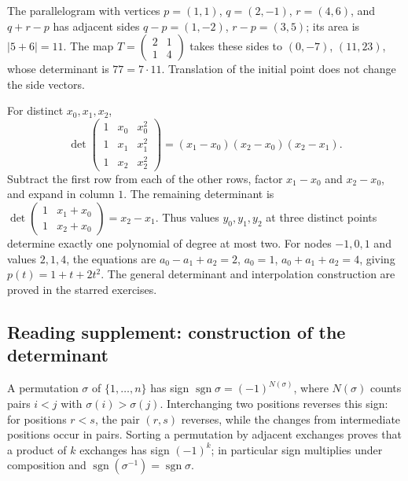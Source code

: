 \begin{example}
The parallelogram with vertices \(p=(1,1)\), \(q=(2,-1)\),
\(r=(4,6)\), and \(q+r-p\) has adjacent sides
\(q-p=(1,-2)\), \(r-p=(3,5)\); its area is \(|5+6|=11\).
The map \(T=\begin{pmatrix}2&1\\1&4\end{pmatrix}\) takes these sides to
\((0,-7)\), \((11,23)\), whose determinant is \(77=7\cdot11\).
Translation of the initial point does not change the side vectors.
\end{example}

\begin{example}
For distinct \(x_0,x_1,x_2\),
\[
 \det\begin{pmatrix}1&x_0&x_0^2\\1&x_1&x_1^2\\1&x_2&x_2^2\end{pmatrix}
 =(x_1-x_0)(x_2-x_0)(x_2-x_1).
\]
Subtract the first row from each of the other rows, factor
\(x_1-x_0\) and \(x_2-x_0\), and expand in column \(1\).
The remaining determinant is
\(\det\begin{pmatrix}1&x_1+x_0\\1&x_2+x_0\end{pmatrix}=x_2-x_1\).
Thus values \(y_0,y_1,y_2\) at three distinct points determine exactly one
polynomial of degree at most two. For nodes \(-1,0,1\) and values \(2,1,4\),
the equations are \(a_0-a_1+a_2=2\), \(a_0=1\),
\(a_0+a_1+a_2=4\), giving \(p(t)=1+t+2t^2\).
The general determinant and interpolation construction are proved in the
starred exercises.
\end{example}

\subsection*{Reading supplement: construction of the determinant}
A permutation \(\sigma\) of \(\{1,\ldots,n\}\) has sign
\(\operatorname{sgn}\sigma=(-1)^{N(\sigma)}\), where \(N(\sigma)\)
counts pairs \(i<j\) with \(\sigma(i)>\sigma(j)\).
Interchanging two positions reverses this sign: for positions \(r<s\),
the pair \((r,s)\) reverses, while the changes from intermediate positions
occur in pairs. Sorting a permutation by adjacent exchanges proves that
a product of \(k\) exchanges has sign \((-1)^k\); in particular sign
multiplies under composition and
\(\operatorname{sgn}(\sigma^{-1})=\operatorname{sgn}\sigma\).

